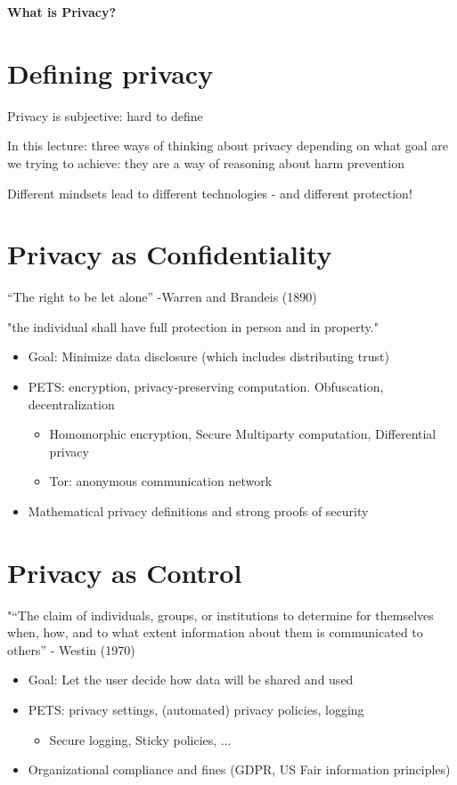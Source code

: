 \documentclass[11pt]{article}
\begin{document}
\vspace{0.5cm}

\begin{center}
  {\LARGE \textbf{What is Privacy?}}
\end{center}
\vspace{0.5cm}

\section*{Defining privacy}

Privacy is subjective: hard to define

In this lecture: three ways of thinking about privacy depending on what goal are we trying to achieve: they are a way of reasoning about harm prevention

Different mindsets lead to different technologies - and different protection!

\section*{Privacy as Confidentiality}
“The right to be let alone” -Warren and Brandeis (1890)

"the individual shall have full protection in person and in property."

\begin{itemize}
	\item Goal: Minimize data disclosure (which includes distributing trust)
	\item PETS: encryption, privacy-preserving computation. Obfuscation, decentralization
		\begin{itemize}
			\item Homomorphic encryption, Secure Multiparty computation, Differential privacy
			\item Tor: anonymous communication network
		\end{itemize}
	\item Mathematical privacy definitions and strong proofs of security
\end{itemize}

\section*{Privacy as Control}
"“The claim of individuals, groups, or institutions to determine for themselves when, how, and to what extent information about them is communicated to others” - Westin (1970)
\begin{itemize}
	\item Goal: Let the user decide how data will be shared and used
	\item PETS: privacy settings, (automated) privacy policies, logging
		\begin{itemize}
			\item Secure logging, Sticky policies, ...
		\end{itemize}
	\item Organizational compliance and fines (GDPR, US Fair information principles)
\end{itemize}
\end{document}
